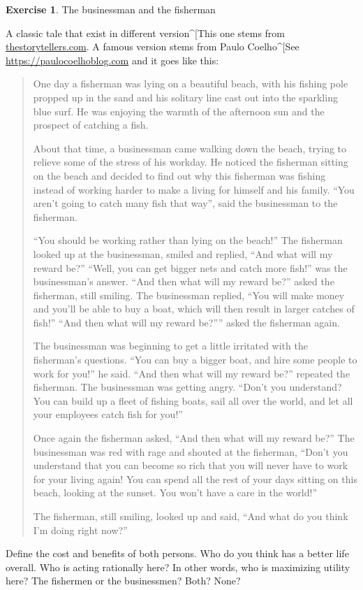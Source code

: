 \documentclass[
  12pt,
  oneside]{book}
\theoremstyle{definition}
\theoremstyle{definition}
\theoremstyle{definition}
\newtheorem{exercise}{Exercise}[chapter]
\theoremstyle{definition}
\theoremstyle{remark}
\begin{document}
\begin{exercise}
\protect\hypertarget{exr:fisherman}{}\label{exr:fisherman}The businessman and the fisherman

A classic tale that exist in different version\^{}{[}This one stems from \href{https://thestorytellers.com/the-businessman-and-the-fisherman}{thestorytellers.com}. A famous version stems from Paulo Coelho\^{}{[}See \href{https://paulocoelhoblog.com/2015/09/04/the-fisherman-and-the-businessman/}{https://paulocoelhoblog.com} and it goes like this:

\begin{quote}
One day a fisherman was lying on a beautiful beach, with his fishing pole propped up in the sand and his solitary line cast out into the sparkling blue surf. He was enjoying the warmth of the afternoon sun and the prospect of catching a fish.

About that time, a businessman came walking down the beach, trying to relieve some of the stress of his workday. He noticed the fisherman sitting on the beach and decided to find out why this fisherman was fishing instead of working harder to make a living for himself and his family. ``You aren't going to catch many fish that way'', said the businessman to the fisherman.

``You should be working rather than lying on the beach!'' The fisherman looked up at the businessman, smiled and replied, ``And what will my reward be?'' ``Well, you can get bigger nets and catch more fish!'' was the businessman's answer. ``And then what will my reward be?'' asked the fisherman, still smiling. The businessman replied, ``You will make money and you'll be able to buy a boat, which will then result in larger catches of fish!'' ``And then what will my reward be?'''' asked the fisherman again.

The businessman was beginning to get a little irritated with the fisherman's questions. ``You can buy a bigger boat, and hire some people to work for you!'' he said. ``And then what will my reward be?'' repeated the fisherman. The businessman was getting angry. ``Don't you understand? You can build up a fleet of fishing boats, sail all over the world, and let all your employees catch fish for you!''

Once again the fisherman asked, ``And then what will my reward be?'' The businessman was red with rage and shouted at the fisherman, ``Don't you understand that you can become so rich that you will never have to work for your living again! You can spend all the rest of your days sitting on this beach, looking at the sunset. You won't have a care in the world!''

The fisherman, still smiling, looked up and said, ``And what do you think I'm doing right now?''
\end{quote}

Define the cost and benefits of both persons. Who do you think has a better life overall.
Who is acting rationally here? In other words, who is maximizing utility here? The fishermen or the businessmen? Both? None?
\end{exercise}
\end{document}
